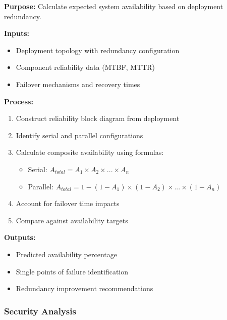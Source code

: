 \documentclass[11pt,letterpaper]{article}
\begin{document}
\begin{definitionbox}
\textbf{Purpose:} Calculate expected system availability based on deployment redundancy.

\textbf{Inputs:}
\begin{itemize}[nosep]
    \item Deployment topology with redundancy configuration
    \item Component reliability data (MTBF, MTTR)
    \item Failover mechanisms and recovery times
\end{itemize}

\textbf{Process:}
\begin{enumerate}[nosep]
    \item Construct reliability block diagram from deployment
    \item Identify serial and parallel configurations
    \item Calculate composite availability using formulas:
    \begin{itemize}[nosep]
        \item Serial: $A_{total} = A_1 \times A_2 \times ... \times A_n$
        \item Parallel: $A_{total} = 1 - (1-A_1) \times (1-A_2) \times ... \times (1-A_n)$
    \end{itemize}
    \item Account for failover time impacts
    \item Compare against availability targets
\end{enumerate}

\textbf{Outputs:}
\begin{itemize}[nosep]
    \item Predicted availability percentage
    \item Single points of failure identification
    \item Redundancy improvement recommendations
\end{itemize}
\end{definitionbox}

\subsubsection{Security Analysis}
\end{document}
